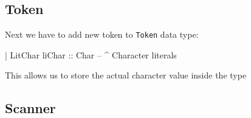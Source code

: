 \documentclass{article}
\begin{document}
\subsection{Token}
\begin{flushleft}
Next we have to add new token to \texttt{Token} data type:
\end{flushleft}
\begin{code}
| LitChar {liChar :: Char}          -- ^ Character literals
\end{code}
\begin{flushleft}
This allows us to store the actual character value inside the type
\end{flushleft}

\subsection{Scanner}
\end{document}
